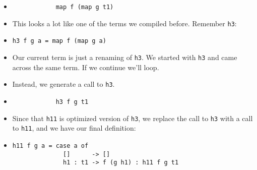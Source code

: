\documentclass{beamer}
\begin{document}
\begin{frame}[fragile]

    \begin{itemize}[<+->]

        \item[]
            \begin{verbatim}
            map f (map g t1)
            \end{verbatim}

        \item[]
            This looks a lot like one of the terms we compiled before.  Remember
            \texttt{h3}:

        \item[]
            \begin{verbatim}
h3 f g a = map f (map g a)
            \end{verbatim}

        \item[]
            Our current term is just a renaming of \texttt{h3}. We started with
            \texttt{h3} and came across the same term. If we continue we'll
            loop.

        \item[] Instead, we generate a call to \texttt{h3}.

        \item[]
            \begin{verbatim}
            h3 f g t1
            \end{verbatim}

        \item[]
            Since that \texttt{h11} is optimized version of \texttt{h3}, we
            replace the call to \texttt{h3} with a call to \texttt{h11}, and we
            have our final definition:

        \item[]
            \begin{verbatim}
h11 f g a = case a of
              []      -> []
              h1 : t1 -> f (g h1) : h11 f g t1
            \end{verbatim}

    \end{itemize}

\end{frame}
\end{document}
